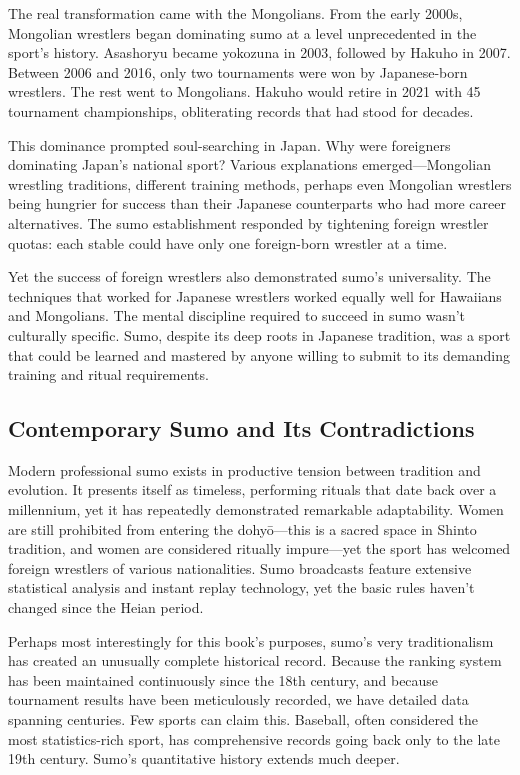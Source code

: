 The real transformation came with the Mongolians. From the early 2000s, Mongolian wrestlers began dominating sumo at a level unprecedented in the sport's history. Asashoryu became yokozuna in 2003, followed by Hakuho in 2007. Between 2006 and 2016, only two tournaments were won by Japanese-born wrestlers. The rest went to Mongolians. Hakuho would retire in 2021 with 45 tournament championships, obliterating records that had stood for decades.

This dominance prompted soul-searching in Japan. Why were foreigners dominating Japan's national sport? Various explanations emerged—Mongolian wrestling traditions, different training methods, perhaps even Mongolian wrestlers being hungrier for success than their Japanese counterparts who had more career alternatives. The sumo establishment responded by tightening foreign wrestler quotas: each stable could have only one foreign-born wrestler at a time.

Yet the success of foreign wrestlers also demonstrated sumo's universality. The techniques that worked for Japanese wrestlers worked equally well for Hawaiians and Mongolians. The mental discipline required to succeed in sumo wasn't culturally specific. Sumo, despite its deep roots in Japanese tradition, was a sport that could be learned and mastered by anyone willing to submit to its demanding training and ritual requirements.

\subsection{Contemporary Sumo and Its Contradictions}

Modern professional sumo exists in productive tension between tradition and evolution. It presents itself as timeless, performing rituals that date back over a millennium, yet it has repeatedly demonstrated remarkable adaptability. Women are still prohibited from entering the dohyō—this is a sacred space in Shinto tradition, and women are considered ritually impure—yet the sport has welcomed foreign wrestlers of various nationalities. Sumo broadcasts feature extensive statistical analysis and instant replay technology, yet the basic rules haven't changed since the Heian period.

Perhaps most interestingly for this book's purposes, sumo's very traditionalism has created an unusually complete historical record. Because the ranking system has been maintained continuously since the 18th century, and because tournament results have been meticulously recorded, we have detailed data spanning centuries. Few sports can claim this. Baseball, often considered the most statistics-rich sport, has comprehensive records going back only to the late 19th century. Sumo's quantitative history extends much deeper.

